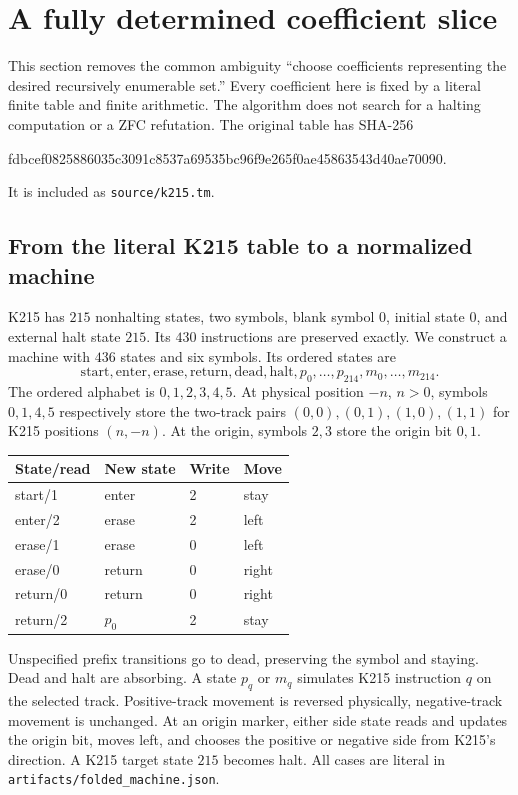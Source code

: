 \documentclass[11pt,a4paper]{article}
\theoremstyle{remark}
\newcommand{\code}[1]{\nolinkurl{#1}}
\begin{document}
\section{A fully determined coefficient slice}
\label{sec:constants}

This section removes the common ambiguity ``choose coefficients
representing the desired recursively enumerable set.'' Every coefficient
here is fixed by a literal finite table and finite arithmetic. The
algorithm does not search for a halting computation or a ZFC refutation.
The original table has SHA-256
\begin{center}\small\ttfamily
fdbcef0825886035c3091c8537a69535bc96f9e265f0ae45863543d40ae70090.
\end{center}
It is included as \code{source/k215.tm}.

\subsection{From the literal K215 table to a normalized machine}

K215 has $215$ nonhalting states, two symbols, blank symbol $0$, initial
state $0$, and external halt state $215$. Its $430$ instructions are
preserved exactly. We construct a machine with $436$ states and six
symbols. Its ordered states are
\[
 \mathrm{start},\mathrm{enter},\mathrm{erase},\mathrm{return},
 \mathrm{dead},\mathrm{halt},p_0,\ldots,p_{214},m_0,\ldots,m_{214}.
\]
The ordered alphabet is $0,1,2,3,4,5$. At physical position $-n$,
$n>0$, symbols $0,1,4,5$ respectively store the two-track pairs
$(0,0),(0,1),(1,0),(1,1)$ for K215 positions $(n,-n)$.
At the origin, symbols $2,3$ store the origin bit $0,1$.

\begin{center}
\begin{tabular}{llll}
\toprule
State/read & New state & Write & Move\\
\midrule
start/1 & enter & 2 & stay\\
enter/2 & erase & 2 & left\\
erase/1 & erase & 0 & left\\
erase/0 & return & 0 & right\\
return/0 & return & 0 & right\\
return/2 & $p_0$ & 2 & stay\\
\bottomrule
\end{tabular}
\end{center}

Unspecified prefix transitions go to dead, preserving the symbol and
staying. Dead and halt are absorbing. A state $p_q$ or $m_q$ simulates
K215 instruction $q$ on the selected track. Positive-track movement is
reversed physically, negative-track movement is unchanged. At an origin
marker, either side state reads and updates the origin bit, moves left,
and chooses the positive or negative side from K215's direction. A
K215 target state $215$ becomes halt. All cases are literal in
\code{artifacts/folded_machine.json}.
\end{document}
